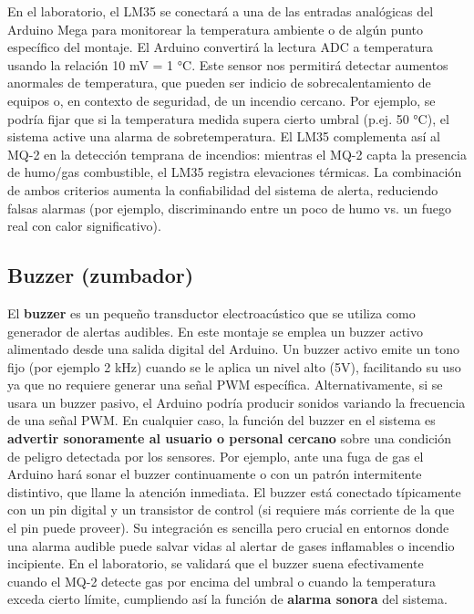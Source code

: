 En el laboratorio, el LM35 se conectará a una de las entradas analógicas del Arduino Mega para monitorear la temperatura ambiente o de algún punto específico del montaje. El Arduino convertirá la lectura ADC a temperatura usando la relación 10 mV = 1 °C. Este sensor nos permitirá detectar aumentos anormales de temperatura, que pueden ser indicio de sobrecalentamiento de equipos o, en contexto de seguridad, de un incendio cercano. Por ejemplo, se podría fijar que si la temperatura medida supera cierto umbral (p.ej. 50 °C), el sistema active una alarma de sobretemperatura. El LM35 complementa así al MQ-2 en la detección temprana de incendios: mientras el MQ-2 capta la presencia de humo/gas combustible, el LM35 registra elevaciones térmicas. La combinación de ambos criterios aumenta la confiabilidad del sistema de alerta, reduciendo falsas alarmas (por ejemplo, discriminando entre un poco de humo vs. un fuego real con calor significativo).

\subsection{Buzzer (zumbador)}
El \textbf{buzzer} es un pequeño transductor electroacústico que se utiliza como generador de alertas audibles. En este montaje se emplea un buzzer activo alimentado desde una salida digital del Arduino. Un buzzer activo emite un tono fijo (por ejemplo 2 kHz) cuando se le aplica un nivel alto (5V), facilitando su uso ya que no requiere generar una señal PWM específica. Alternativamente, si se usara un buzzer pasivo, el Arduino podría producir sonidos variando la frecuencia de una señal PWM. En cualquier caso, la función del buzzer en el sistema es \textbf{advertir sonoramente al usuario o personal cercano} sobre una condición de peligro detectada por los sensores. Por ejemplo, ante una fuga de gas el Arduino hará sonar el buzzer continuamente o con un patrón intermitente distintivo, que llame la atención inmediata. El buzzer está conectado típicamente con un pin digital y un transistor de control (si requiere más corriente de la que el pin puede proveer). Su integración es sencilla pero crucial en entornos donde una alarma audible puede salvar vidas al alertar de gases inflamables o incendio incipiente. En el laboratorio, se validará que el buzzer suena efectivamente cuando el MQ-2 detecte gas por encima del umbral o cuando la temperatura exceda cierto límite, cumpliendo así la función de \textbf{alarma sonora} del sistema.

